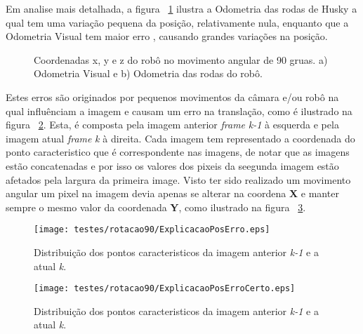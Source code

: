 Em analise mais detalhada, a figura ~\ref{fig:posRot90} ilustra a Odometria das rodas de Husky a qual tem uma variação pequena da posição, relativamente nula, enquanto que a Odometria Visual tem maior erro , causando grandes variações na posição. 

\begin{figure}[h!]
	\centering
	\qquad
	\caption{Coordenadas x, y e z do robô  no movimento angular de 90 gruas. a) Odometria Visual e b) Odometria das rodas do robô.}
	\label{fig:posRot90}
\end{figure}


Estes erros são originados por pequenos movimentos da câmara e/ou robô na qual influênciam a imagem e causam um erro na translação, como é ilustrado na figura ~\ref{fig:ExplicPosErr}. Esta, é composta pela imagem anterior \textit{frame} \textit{k-1} à esquerda e pela imagem atual \textit{frame} \textit{k} à direita. Cada imagem tem representado a coordenada do ponto caracteristico que é correspondente nas imagens, de notar que as imagens estão concatenadas e por isso os valores dos pixeis da seegunda imagem estão afetados pela largura da primeira image. Visto ter sido realizado um movimento angular um pixel na imagem devia apenas se alterar na coordena \textbf{X} e manter sempre o mesmo valor da coordenada \textbf{Y}, como ilustrado na figura ~\ref{fig:ExplicPosErrCerto}.



\begin{figure}[h!]
	\begin{center}
		\leavevmode		
		\texttt{[image: testes/rotacao90/ExplicacaoPosErro.eps]}
		\caption{Distribuição dos pontos caracteristicos da imagem anterior \textit{k-1} e a atual \textit{k}.}
		\label{fig:ExplicPosErr}
	\end{center}
\end{figure}


\begin{figure}[h!]
	\begin{center}
		\leavevmode		
		\texttt{[image: testes/rotacao90/ExplicacaoPosErroCerto.eps]}
		\caption{Distribuição dos pontos caracteristicos da imagem anterior \textit{k-1} e a atual \textit{k}.}
		\label{fig:ExplicPosErrCerto}
	\end{center}
\end{figure}



